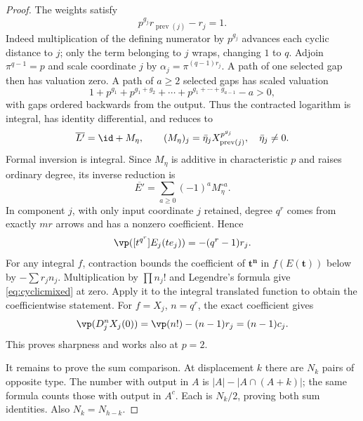 \begin{proof}
The weights satisfy
\begin{equation}\label{eq:cyclicedge}
 p^{g_j}r_{\operatorname{prev}(j)}-r_j=1.
\end{equation}
Indeed multiplication of the defining numerator by $p^{g_j}$ advances each cyclic distance to $j$; only the term belonging to $j$ wraps, changing $1$ to $q$. Adjoin $\pi^{q-1}=p$ and scale coordinate $j$ by $\alpha_j=\pi^{(q-1)r_j}$. A path of one selected gap then has valuation zero. A path of $a\ge2$ selected gaps has scaled valuation
\[
 1+p^{g_1}+p^{g_1+g_2}+\cdots+
       p^{g_1+\cdots+g_{a-1}}-a>0,
\]
with gaps ordered backwards from the output. Thus the contracted logarithm is integral, has identity differential, and reduces to
\[
 \overline{L'}=\id+M_\eta,\qquad
 (M_\eta)_j=\bar\eta_jX_{\operatorname{prev}(j)}^{p^{g_j}},
 \quad\bar\eta_j\ne0.
\]
Formal inversion is integral. Since $M_\eta$ is additive in characteristic $p$ and raises ordinary degree, its inverse reduction is
\[
 \overline{E'}=\sum_{a\ge0}(-1)^aM_\eta^{\circ a}.
\]
In component $j$, with only input coordinate $j$ retained, degree $q^r$ comes from exactly $mr$ arrows and has a nonzero coefficient. Hence
\[
 \vp([t^{q^r}]E_j(te_j))=-(q^r-1)r_j.
\]
For any integral $f$, contraction bounds the coefficient of $\mathbf t^{\mathbf n}$ in $f(E(\mathbf t))$ below by $-\sum r_jn_j$. Multiplication by $\prod n_j!$ and Legendre's formula give \eqref{eq:cyclicmixed} at zero. Apply it to the integral translated function to obtain the coefficientwise statement. For $f=X_j$, $n=q^r$, the exact coefficient gives
\[
 \vp(D_j^nX_j(0))=\vp(n!)-(n-1)r_j=(n-1)c_j.
\]
This proves sharpness and works also at $p=2$.

It remains to prove the sum comparison. At displacement $k$ there are $N_k$ pairs of opposite type. The number with output in $A$ is
$|A|-|A\cap(A+k)|$; the same formula counts those with output in $A^c$. Each is $N_k/2$, proving both sum identities. Also $N_k=N_{h-k}$.


\end{proof}
